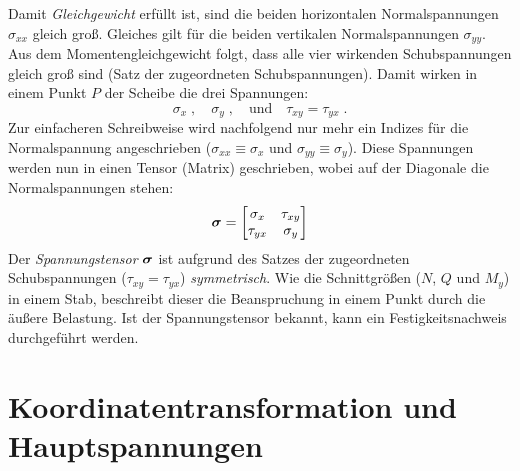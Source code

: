 Damit \emph{Gleichgewicht} erfüllt ist, sind die beiden horizontalen Normalspannungen $\sigma_{xx}$ gleich groß.
Gleiches gilt für die beiden vertikalen Normalspannungen $\sigma_{yy}$.
Aus dem Momentengleichgewicht folgt, dass alle vier wirkenden Schubspannungen gleich groß sind (Satz der zugeordneten Schubspannungen).
Damit wirken in einem Punkt $P$ der Scheibe die drei Spannungen:
%
\begin{equation}
\sigma_x\;,\quad \sigma_y\;, \quad \text{und} \quad \tau_{xy}=\tau_{yx} \;.
\label{eq:5-1}
\end{equation}
%
Zur einfacheren Schreibweise wird nachfolgend nur mehr ein Indizes für die Normalspannung angeschrieben ($\sigma_{xx}\equiv\sigma_x$ und $\sigma_{yy}\equiv\sigma_y$).
Diese Spannungen werden nun in einen Tensor (Matrix) geschrieben, wobei auf der Diagonale die Normalspannungen stehen:
%
\begin{equation}
\boldsymbol{\sigma} = 
\begin{bmatrix}
\sigma_x & \tau_{xy} \\ \tau_{yx} & \sigma_y
\end{bmatrix}
\label{eq:5-2}
\end{equation}
%
Der \emph{Spannungstensor} $\boldsymbol{\sigma}$ ist aufgrund des Satzes der zugeordneten Schubspannungen ($\tau_{xy}=\tau_{yx}$) \emph{symmetrisch}.
Wie die Schnittgrößen ($N$, $Q$ und $M_y$) in einem Stab, beschreibt dieser die Beanspruchung in einem Punkt durch die äußere Belastung.
Ist der Spannungstensor bekannt, kann ein Festigkeitsnachweis durchgeführt werden.



\section{Koordinatentransformation und Hauptspannungen}

